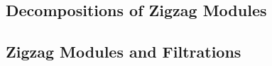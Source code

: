 \subsection{Decompositions of Zigzag Modules}
\label{DecompositionsofZigzagModules}

\subsection{Zigzag Modules and Filtrations}
\label{ZigzagModulesandFiltrations}
